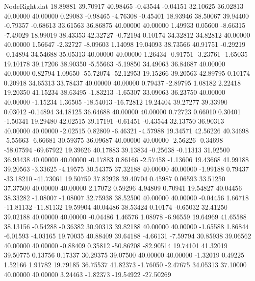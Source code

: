 \begin{filecontents}{NodeRight.dat}
  18.89881   39.70917   40.98465    -0.43544   -0.04151   32.10625   36.02813   40.00000   40.00000    0.29083   -0.98465   -4.76308   -0.45401
  18.93946   38.50067   39.94400    -0.79357   -0.68613   33.61563   36.86875   40.00000   40.00000    1.49933    0.05600   -8.66315   -7.49029
  18.99019   38.43353   42.32727    -0.72194    0.10174   34.32812   34.82812   40.00000   40.00000    1.56647   -2.32727   -8.09603    1.14098
  19.04093   38.73566   40.91751    -0.29219   -0.14894   34.54688   35.05313   40.00000   40.00000    1.26434   -0.91751   -3.23761   -1.65035
  19.10178   39.17206   38.90350    -5.55663   -5.19850   34.49063   36.84687   40.00000   40.00000    0.82794    1.09650  -55.72074  -52.12953
  19.15266   39.20563   42.89795     0.10174    0.20918   34.65313   33.78437   40.00000   40.00000    0.79437   -2.89795    1.08182    2.22418
  19.20350   41.15234   38.63495    -1.83213   -1.65307   33.09063   36.23750   40.00000   40.00000   -1.15234    1.36505  -18.54013  -16.72812
  19.24404   39.27277   39.33990     0.03012   -0.14894   34.18125   36.64688   40.00000   40.00000    0.72723    0.66010    0.30401   -1.50341
  19.29480   42.02515   39.17191    -0.61451   -0.43544   32.13750   36.90313   40.00000   40.00000   -2.02515    0.82809   -6.46321   -4.57988
  19.34571   42.56226   40.34698    -5.55663   -6.66681   30.59375   36.09687   40.00000   40.00000   -2.56226   -0.34698  -58.07594  -69.67922
  19.39626   40.17883   39.13834    -0.25638   -0.11313   31.92500   36.93438   40.00000   40.00000   -0.17883    0.86166   -2.57458   -1.13606
  19.43668   41.99188   39.20563    -3.33625   -4.19575   30.54375   37.32188   40.00000   40.00000   -1.99188    0.79437  -33.18210  -41.73061
  19.50759   37.82928   39.40704     0.45987    0.06593   33.51250   37.37500   40.00000   40.00000    2.17072    0.59296    4.94809    0.70941
  19.54827   40.04456   38.33282    -1.08007   -1.08007   32.75938   38.52500   40.00000   40.00000   -0.04456    1.66718  -11.81132  -11.81132
  19.59904   40.04486   38.53424     0.10174   -0.65032   32.41250   39.02188   40.00000   40.00000   -0.04486    1.46576    1.08978   -6.96559
  19.64969   41.65588   38.13156    -0.54288   -0.36382   30.90313   39.82188   40.00000   40.00000   -1.65588    1.86844   -6.01593   -4.03165
  19.70035   40.88409   39.64188    -4.66131   -7.59794   30.85938   39.06562   40.00000   40.00000   -0.88409    0.35812  -50.86208  -82.90514
  19.74101   41.32019   39.50775     0.13756    0.17337   30.29375   39.07500   40.00000   40.00000   -1.32019    0.49225    1.52166    1.91782
  19.79185   36.75537   41.82373    -1.76050   -2.47675   34.05313   37.10000   40.00000   40.00000    3.24463   -1.82373  -19.54922  -27.50269

\end{filecontents}
